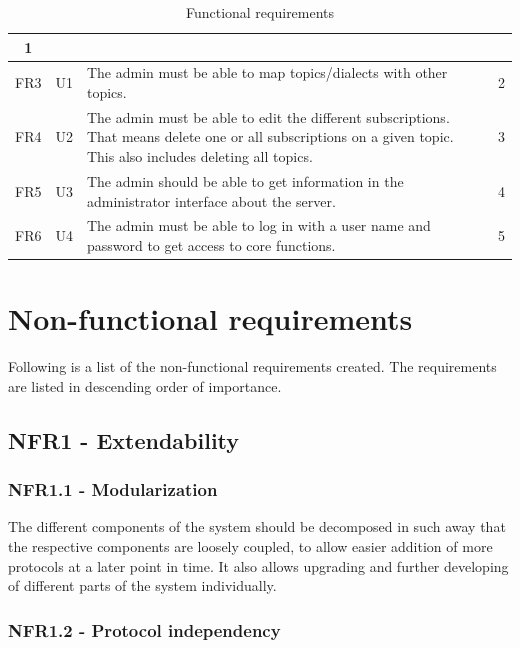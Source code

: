 \begin{table}[ht!]
{\begin{tabular}{|l|l|p{5cm}|l|}
\multicolumn{1}{c|}{1} \\ \hline
\multicolumn{1}{|c|}{FR3} & \multicolumn{1}{c|}{U1} & The admin must be able to map topics/dialects with other topics. &
\multicolumn{1}{c|}{2} \\ \hline
\multicolumn{1}{|c|}{FR4} & \multicolumn{1}{c|}{U2} & The admin must be able to edit the different subscriptions. That means delete one or all subscriptions on a given topic. This also includes deleting all topics. & \multicolumn{1}{c|}{3} \\ \hline
\multicolumn{1}{|c|}{FR5} & \multicolumn{1}{c|}{U3} & The admin should be able to get information in the administrator interface about the server. &  \multicolumn{1}{c|}{4} \\ \hline
\multicolumn{1}{|c|}{FR6} & \multicolumn{1}{c|}{U4} & The admin must be able to log in with a user name and password to get access to core functions. & \multicolumn{1}{c|}{5} \\ \hline
\end{tabular}
}
\caption{Functional requirements}
\label{func-requirements}
\end{table}

\clearpage

\section{Non-functional requirements}

Following is a list of the non-functional requirements created. The requirements are listed in descending order of importance. 

\subsection{NFR1 - Extendability}

\subsubsection{NFR1.1 - Modularization}

The different components of the system should be decomposed in such away that the respective components are loosely coupled, to allow easier addition of more protocols at a later point in time. It also allows upgrading and further developing of different parts of the system individually.

\subsubsection{NFR1.2 - Protocol independency}

